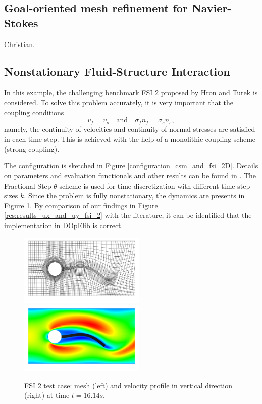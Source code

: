 \documentclass[prodmode,acmtoms]{acmsmall}
\numberwithin{equation}{section}
\begin{document}
\subsection{Goal-oriented mesh refinement for Navier-Stokes}
Christian.


\subsection{Nonstationary Fluid-Structure Interaction}
In this example, the challenging benchmark FSI 2
proposed by Hron and Turek \cite{HrTu06b} is considered.
To solve this problem accurately, it is very important that 
the coupling conditions
\[
v_f = v_s \quad \text{and} \quad \sigma_f n_f = \sigma_s n_s, 
\]
namely, the continuity of velocities and continuity of normal stresses
are satisfied in each time step. This is achieved with the help of 
a monolithic coupling scheme (strong coupling).

The configuration is 
sketched in Figure \ref{configuration_csm_and_fsi_2D}. Details 
on parameters and evaluation functionals and other results 
can be found in \cite{HrTu06b, BuSc06, TuHrMaRaWoAc10, DeHaeAnnBrVie10, Wi11}. 
The Fractional-Step-$\theta$ scheme is used for time discretization with
different time step sizes $k$. Since the problem is fully nonstationary, the 
dynamics are presents in Figure \ref{res:fsi_2_mesh_and_x_velo}. 
By comparison of our findings in Figure \ref{res:results_ux_and_uy_fsi_2}
with the literature, it can be identified that 
the implementation in DOpElib is correct.



\begin{figure}[h]
\centering
{\includegraphics[width=6cm]{Pictures/visit_fsi_2_CNn_t_2e-2_global_3_biharmonic_mesh8070_scale.png}}
{\includegraphics[width=6cm]{Pictures/visit_fsi_2_CNn_t_2e-2_global_3_biharmonic_x_velo8070_scale.png}}
\caption{FSI 2 test case: mesh (left) and velocity profile in vertical 
direction (right) at time $t=16.14s$.}
\label{res:fsi_2_mesh_and_x_velo}
\end{figure}
\end{document}
